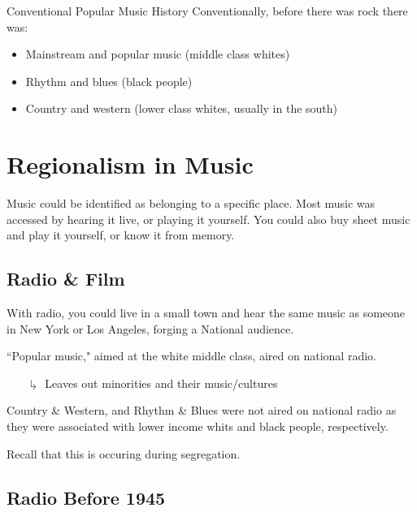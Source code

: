 \documentclass[12pt, a4paper, twoside, openright, titlepage]{book}
\begin{document}
\begin{defn}{Conventional Popular Music History}{}
    Conventionally, before there was rock there was: \begin{itemize}
        \item Mainstream and popular music (middle class whites)
        \item Rhythm and blues (black people)
        \item Country and western (lower class whites, usually in the south)
    \end{itemize}
\end{defn}


\section{Regionalism in Music}

Music could be identified as belonging to a specific place. Most music was accessed by hearing it live, or playing it yourself. You could also buy sheet music and play it yourself, or know it from memory.

\subsection{Radio \& Film}

\begin{rmk}{}{}
    With radio, you could live in a small town and hear the same music as someone in New York or Los Angeles, forging a National audience. 

\end{rmk}

\begin{note}{}{}
    ``Popular music," aimed at the white middle class, aired on national radio. \begin{enumerate}
        \item[$\drsh$] Leaves out minorities and their music/cultures
    \end{enumerate}
\end{note}

\begin{rmk}{}{}
    Country \& Western, and Rhythm \& Blues were not aired on national radio as they were associated with lower income whits and black people, respectively.
\end{rmk}

Recall that this is occuring during segregation.

\subsection{Radio Before 1945}
\end{document}
